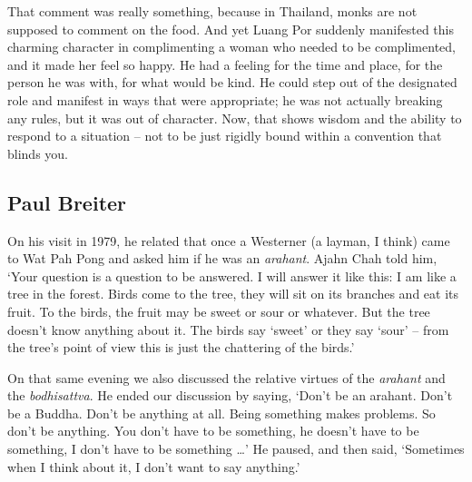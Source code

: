That comment was really something, because in Thailand, monks are not
supposed to comment on the food. And yet Luang Por suddenly manifested
this charming character in complimenting a woman who needed to be
complimented, and it made her feel so happy. He had a feeling for the
time and place, for the person he was with, for what would be kind. He
could step out of the designated role and manifest in ways that were
appropriate; he was not actually breaking any rules, but it was out of
character. Now, that shows wisdom and the ability to respond to a
situation -- not to be just rigidly bound within a convention that
blinds you. 

\subsection{Paul Breiter}

On his visit in 1979, he related that once a Westerner (a layman, I
think) came to Wat Pah Pong and asked him if he was an \emph{arahant}.
Ajahn Chah told him, `Your question is a question to be answered. I will
answer it like this: I am like a tree in the forest. Birds come to the
tree, they will sit on its branches and eat its fruit. To the birds, the
fruit may be sweet or sour or whatever. But the tree doesn't know
anything about it. The birds say `sweet' or they say `sour' -- from the
tree's point of view this is just the chattering of the birds.'

On that same evening we also discussed the relative virtues of the
\emph{arahant} and the \emph{bodhisattva}. He ended our discussion by
saying, `Don't be an arahant. Don't be a Buddha. Don't be anything at
all. Being something makes problems. So don't be anything. You don't
have to be something, he doesn't have to be something, I don't have to
be something \ldots{}' He paused, and then said, `Sometimes when I think
about it, I don't want to say anything.'

